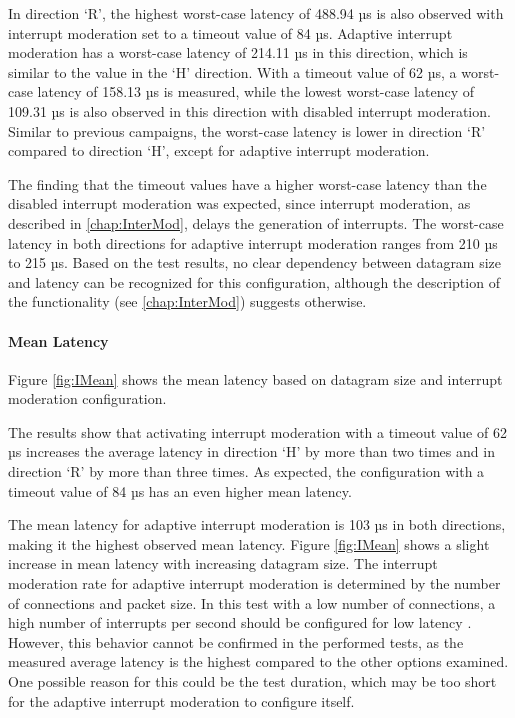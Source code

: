 In direction `R', the highest worst-case latency of 488.94 µs is also observed with interrupt moderation set to a timeout value of 84 µs. Adaptive interrupt moderation has a worst-case latency of 214.11 µs in this direction, which is similar to the value in the `H' direction. With a timeout value of 62 µs, a worst-case latency of 158.13 µs is measured, while the lowest worst-case latency of 109.31 µs is also observed in this direction with disabled interrupt moderation. Similar to previous campaigns, the worst-case latency is lower in direction `R' compared to direction `H', except for adaptive interrupt moderation.

The finding that the timeout values have a higher worst-case latency than the disabled interrupt moderation was expected, since interrupt moderation, as described in \ref{chap:InterMod}, delays the generation of interrupts.  The worst-case latency in both directions for adaptive interrupt moderation ranges from 210 µs to 215 µs. Based on the test results, no clear dependency between datagram size and latency can be recognized for this configuration, although the description of the functionality (see \ref{chap:InterMod}) suggests otherwise.

\paragraph{Mean Latency}

Figure \ref{fig:IMean} shows the mean latency based on datagram size and interrupt moderation configuration.

The results show that activating interrupt moderation with a timeout value of 62 µs increases the average latency in direction `H' by more than two times and in direction `R' by more than three times. As expected, the configuration with a timeout value of 84 µs has an even higher mean latency.

The mean latency for adaptive interrupt moderation is 103 µs in both directions, making it the highest observed mean latency. Figure \ref{fig:IMean} shows a slight increase in mean latency with increasing datagram size. The interrupt moderation rate for adaptive interrupt moderation is determined by the number of connections and packet size. In this test with a low number of connections, a high number of interrupts per second should be configured for low latency \cite{intermod04}. However, this behavior cannot be confirmed in the performed tests, as the measured average latency is the highest compared to the other options examined. One possible reason for this could be the test duration, which may be too short for the adaptive interrupt moderation to configure itself.

